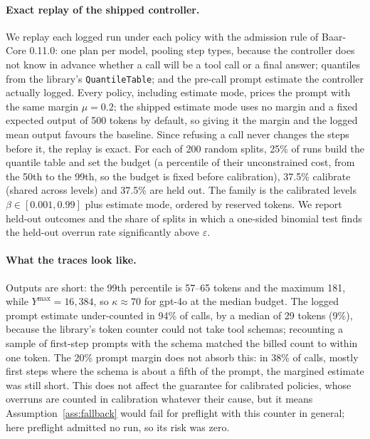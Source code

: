 \documentclass[11pt]{article}
\theoremstyle{remark}
\begin{document}
\paragraph{Exact replay of the shipped controller.}
We replay each logged run under each policy with the admission rule of
Baar-Core 0.11.0: one plan per model, pooling step types, because the
controller does not know in advance whether a call will be a tool call or a
final answer; quantiles from the library's \texttt{QuantileTable}; and the
pre-call prompt estimate the controller actually logged. Every policy,
including estimate mode, prices the prompt with the same margin $\mu = 0.2$;
the shipped estimate mode uses no margin and a fixed expected output of 500
tokens by default, so giving it the margin and the logged mean output favours
the baseline. Since refusing a call never changes the steps before it, the
replay is exact. For each of 200 random splits, 25\% of runs build the quantile
table and set the budget (a percentile of their unconstrained cost, from the
50th to the 99th, so the budget is fixed before calibration), 37.5\% calibrate
(shared across levels) and 37.5\% are held out. The family is the calibrated
levels $\beta \in [0.001, 0.99]$ plus estimate mode, ordered by reserved tokens.
We report held-out outcomes and the share of splits in which a one-sided
binomial test finds the held-out overrun rate significantly above
$\varepsilon$.

\paragraph{What the traces look like.}
Outputs are short: the 99th percentile is 57--65 tokens and the maximum 181,
while $Y^{\max} = 16{,}384$, so $\kappa \approx 70$ for gpt-4o at the median
budget. The logged prompt estimate under-counted in 94\% of calls, by a median
of 29 tokens (9\%), because the library's token counter could not take tool
schemas; recounting a sample of first-step prompts with the schema matched the billed
count to within one token. The 20\% prompt margin does not absorb this: in
38\% of calls, mostly first steps where the schema is about a fifth of the
prompt, the margined estimate was still short. This does not affect the
guarantee for calibrated policies, whose overruns are counted in calibration
whatever their cause, but it means Assumption~\ref{ass:fallback} would fail for
preflight with this counter in general; here preflight admitted no run, so its
risk was zero.
\end{document}

